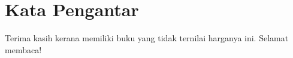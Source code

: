 \chapter{Kata Pengantar}
Terima kasih kerana memiliki buku yang tidak ternilai harganya ini.
Selamat membaca!

